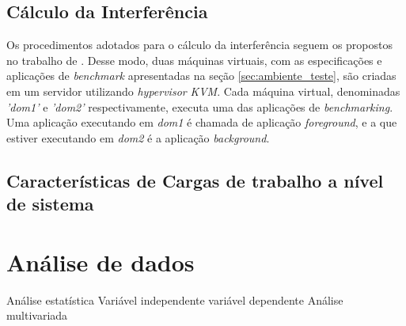 \subsection{Cálculo da Interferência}
Os procedimentos adotados para o cálculo da interferência seguem os propostos no trabalho de . Desse modo, duas máquinas virtuais, com as especificações e aplicações de \textit{benchmark} apresentadas na seção \ref{sec:ambiente_teste}, são criadas em um servidor utilizando \textit{hypervisor} \textit{KVM}. Cada máquina virtual, denominadas \textit{'dom1'} e \textit{'dom2'} respectivamente, executa uma das aplicações de \textit{benchmarking}. Uma aplicação executando em \textit{dom1} é chamada de aplicação \textit{foreground}, e a que estiver executando em \textit{dom2} é a aplicação \textit{background}. 
\subsection{Características de Cargas de trabalho a nível de sistema}


\section{Análise de dados}
Análise estatística
Variável independente
variável dependente
Análise multivariada
 	